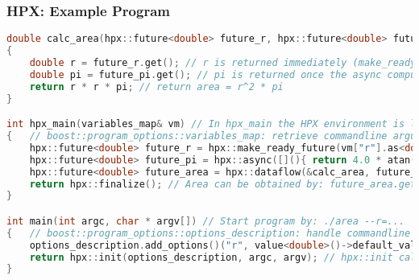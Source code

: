 
\begin{frame}[fragile]
\frametitle{HPX: Example Program}
\begin{lstlisting}[language=C++]
double calc_area(hpx::future<double> future_r, hpx::future<double> future_pi)
{
    double r = future_r.get(); // r is returned immediately (make_ready_future)
    double pi = future_pi.get(); // pi is returned once the async computation finishes
    return r * r * pi; // return area = r^2 * pi
}

int hpx_main(variables_map& vm) // In hpx_main the HPX environment is loaded
{   // boost::program_options::variables_map: retrieve commandline arguments
    hpx::future<double> future_r = hpx::make_ready_future(vm["r"].as<double>());
    hpx::future<double> future_pi = hpx::async([](){ return 4.0 * atan(1.0); });
    hpx::future<double> future_area = hpx::dataflow(&calc_area, future_r, future_pi);
    return hpx::finalize(); // Area can be obtained by: future_area.get()
}

int main(int argc, char * argv[]) // Start program by: ./area --r=...
{   // boost::program_options::options_description: handle commandline arguments
    options_description.add_options()("r", value<double>()->default_value(1.0), "Radius: r");
    return hpx::init(options_description, argc, argv); // hpx::init calls hpx_main
}
\end{lstlisting}
\end{frame}


